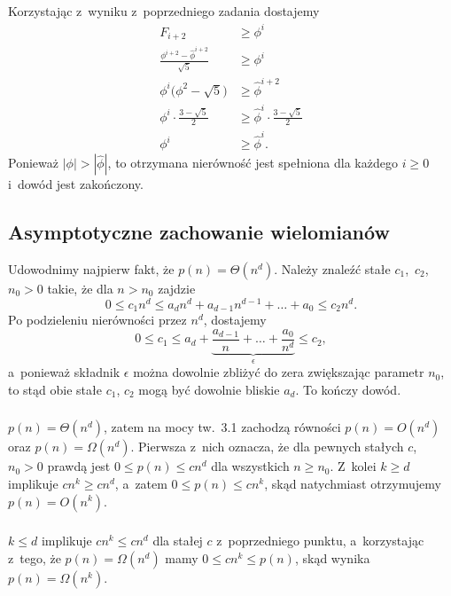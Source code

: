 \subsection{} %
Korzystając z~wyniku z~poprzedniego zadania dostajemy
\begin{align*}
	F_{i+2} &\ge \phi^i \\
	\frac{\phi^{i+2}-\widehat\phi^{i+2}}{\sqrt{5}} &\ge \phi^i \\
	\phi^i\bigl(\phi^2-\sqrt{5}\bigr) &\ge \widehat\phi^{i+2} \\
	\phi^i\cdot\frac{3-\sqrt{5}}{2} &\ge \widehat\phi^i\cdot\frac{3-\sqrt{5}}{2} \\
	\phi^i &\ge \widehat\phi^i.
\end{align*}
Ponieważ $|\phi|>|\widehat\phi|$, to otrzymana nierówność jest spełniona dla każdego $i\ge0$ i~dowód jest zakończony.

\problems

\subsection{Asymptotyczne zachowanie wielomianów} %
Udowodnimy najpierw fakt, że $p(n)=\Theta(n^d)$. Należy znaleźć stałe $c_1$,~$c_2$,~$n_0>0$ takie, że dla $n>n_0$ zajdzie
\[
	0 \le c_1n^d \le a_dn^d+a_{d-1}n^{d-1}+\dots+a_0 \le c_2n^d.
\]
Po podzieleniu nierówności przez $n^d$, dostajemy
\[
	0 \le c_1 \le a_d+\underbrace{\frac{a_{d-1}}{n}+\dots+\frac{a_0}{n^d}}_\epsilon \le c_2,
\]
a~ponieważ składnik $\epsilon$ można dowolnie zbliżyć do zera zwiększając parametr $n_0$, to stąd obie stałe $c_1$, $c_2$ mogą być dowolnie bliskie $a_d$. To kończy dowód.

\subsubsection{} %
$p(n)=\Theta(n^d)$, zatem na mocy tw.~3.1 zachodzą równości $p(n)=O(n^d)$ oraz $p(n)=\Omega(n^d)$. Pierwsza z~nich oznacza, że dla pewnych stałych $c$,~$n_0>0$ prawdą jest $0\le p(n)\le cn^d$ dla wszystkich $n\ge n_0$. Z~kolei $k\ge d$ implikuje $cn^k\ge cn^d$, a~zatem $0\le p(n)\le cn^k$, skąd natychmiast otrzymujemy $p(n)=O(n^k)$.

\subsubsection{} %
$k\le d$ implikuje $cn^k\le cn^d$ dla stałej $c$ z~poprzedniego punktu, a~korzystając z~tego, że $p(n)=\Omega(n^d)$ mamy $0\le cn^k\le p(n)$, skąd wynika $p(n)=\Omega(n^k)$.

